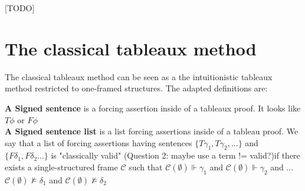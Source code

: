 \documentclass[runningheads]{llncs}
\begin{document}
[TODO]

\section{The classical tableaux method}

The classical tableaux method can be seen as a the intuitionistic tableaux method restricted to 
one-framed structures. The adapted definitions are: 



\begin{definition}
    \textbf{A Signed sentence} is a forcing assertion inside of a tableaux proof. It looks like $T \phi $ or $F \phi $ \\
    \textbf{A Signed sentence list} is a list forcing assertions inside of a tableau proof. We say that a list of forcing assertions having sentences $\{ T\gamma_{1}, T\gamma_{2}, ...\}$
  and $ \{F\delta_{1}, F\delta_{2}...\} $
     is "classically valid" (Question 2: maybe use a term != valid?)if there exists a single-structured frame  $\mathcal{C}$ such that $ \mathcal{C}(\emptyset) \Vdash \gamma_{1}$ and $ \mathcal{C}(\emptyset) \Vdash \gamma_{2}$ and ... $ \mathcal{C}(\emptyset) \nvDash \delta_{1}$  and $ \mathcal{C}(\emptyset) \nvDash \delta_{2}$
\end{definition}
 
\end{document}

